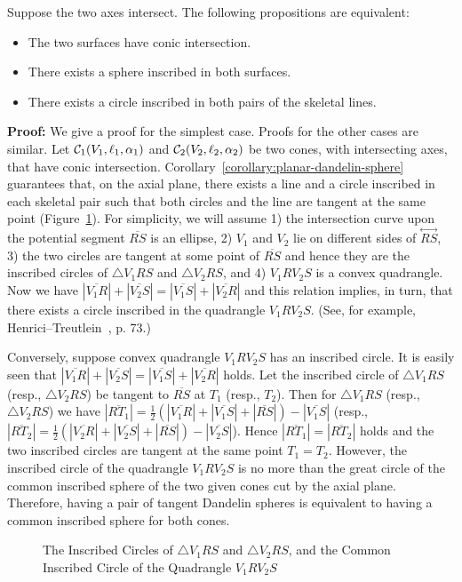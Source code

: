 \begin{theorem}
\label{theorem:intersecting-axes-characterization}
     Suppose the two axes intersect.  The following propositions are
equivalent:
\begin{itemize}
     \item The two surfaces have conic intersection.
     \item There exists a sphere inscribed in both surfaces.
     \item There exists a circle inscribed in both pairs of the skeletal lines.
\end{itemize}
\end{theorem}
{\bf Proof:} We give a proof for the simplest case.
Proofs for the other cases are similar.
Let ${\cal C}_1(V_1,\ell_1,\alpha_1)$ and ${\cal C}_2(V_2,\ell_2,\alpha_2)$
be two cones, with intersecting axes, that have conic intersection.
Corollary~\ref{corollary:planar-dandelin-sphere} guarantees that, on the axial
plane, there exists a line and a circle inscribed in each skeletal pair such
that both circles and the line are tangent at the same 
point (Figure~\ref{fig:inscribed-circle}).  For simplicity,
we will assume 1) the intersection curve upon the potential segment
$\overline{RS}$ is an ellipse, 2) $V_1$ and $V_2$ lie on different sides of 
$\stackrel{\longleftrightarrow}{RS}$, 3) the two circles are tangent at some 
point of $\overline{RS}$ and hence they are the inscribed circles of 
$\bigtriangleup V_1RS$ and $\bigtriangleup V_2RS$, and 4) $V_1RV_2S$ is a
convex quadrangle.  Now we have
$|\overline{V_1R}|+|\overline{V_2S}|=|\overline{V_1S}|+|\overline{V_2R}|$ and
this relation implies, in turn, that there exists a circle inscribed in the
quadrangle $V_1RV_2S$.
(See, for example, Henrici--Treutlein~\cite{henrici:1897},
p. 73.)  

     Conversely, suppose convex quadrangle $V_1RV_2S$ has an inscribed
circle.  It is easily seen that $|\overline{V_1R}|+|\overline{V_2S}|=
|\overline{V_1S}|+|\overline{V_2R}|$ holds.  Let the inscribed circle of
$\bigtriangleup V_1RS$ (resp., $\bigtriangleup V_2RS$) be tangent to
$\overline{RS}$ at $T_1$ (resp., $T_2$).  Then for $\bigtriangleup V_1RS$ 
(resp.,
$\bigtriangleup V_2RS$) we have $|\overline{RT_1}|=
\frac{1}{2}(|\overline{V_1R}|+|\overline{V_1S}|+|\overline{RS}|)-
|\overline{V_1S}|$ (resp., $|\overline{RT_2}|=
\frac{1}{2}(|\overline{V_2R}|+|\overline{V_2S}|+|\overline{RS}|)-
|\overline{V_2S}|$).  Hence $|\overline{RT_1}|=|\overline{RT_2}|$ holds and 
the two inscribed circles are tangent at the same point $T_1=T_2$.  However,
the inscribed circle of the quadrangle $V_1RV_2S$ is no more than the great
circle of the common inscribed sphere of the two given cones cut by the 
axial plane.  Therefore, having a pair of
tangent Dandelin spheres is equivalent to having a common inscribed sphere for
both cones.\ \ \ \QED
\begin{figure}[h]
\vspace{4cm}
\caption{The Inscribed Circles of $\bigtriangleup V_1RS$ and $\bigtriangleup V_2RS$,
and the Common Inscribed Circle of the Quadrangle $V_1RV_2S$}
\label{fig:inscribed-circle}
\end{figure}
     
